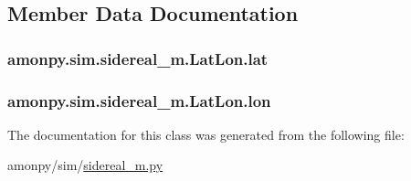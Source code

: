 \subsection{Member Data Documentation}
\hypertarget{classamonpy_1_1sim_1_1sidereal__m_1_1_lat_lon_a976255a27251aa9ba8c9f93d5969e0c5}{
\subsubsection[{lat}]{\setlength{\rightskip}{0pt plus 5cm}amonpy.\-sim.\-sidereal\-\_\-m.\-Lat\-Lon.\-lat}}\label{classamonpy_1_1sim_1_1sidereal__m_1_1_lat_lon_a976255a27251aa9ba8c9f93d5969e0c5}
\hypertarget{classamonpy_1_1sim_1_1sidereal__m_1_1_lat_lon_ab3e5f72c3d32f4281fd3b373b2b4d17b}{
\subsubsection[{lon}]{\setlength{\rightskip}{0pt plus 5cm}amonpy.\-sim.\-sidereal\-\_\-m.\-Lat\-Lon.\-lon}}\label{classamonpy_1_1sim_1_1sidereal__m_1_1_lat_lon_ab3e5f72c3d32f4281fd3b373b2b4d17b}


The documentation for this class was generated from the following file\-:\begin{DoxyCompactItemize}
\item 
amonpy/sim/\hyperlink{sidereal__m_8py}{sidereal\-\_\-m.\-py}\end{DoxyCompactItemize}
